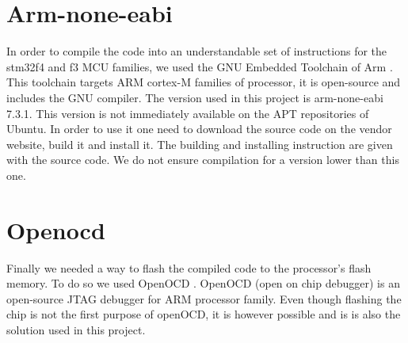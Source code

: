 \documentclass[12pt,a4paper]{report}
\begin{document}
\section{Arm-none-eabi}
In order to compile the code into an understandable set of instructions for the stm32f4 and f3 MCU families, we used the GNU Embedded Toolchain of Arm \cite{arm}. This toolchain targets ARM cortex-M families of processor, it is open-source and includes the GNU compiler. The version used in this project is arm-none-eabi 7.3.1. This version is not immediately available on the APT repositories of Ubuntu. In order to use it one need to download the source code on the vendor website, build it and install it. The building and installing instruction are given with the source code. We do not ensure compilation for a version lower than this one.

\section{Openocd}
Finally we needed a way to flash the compiled code to the processor's flash memory. To do so we used OpenOCD \cite{hoglAbstractopen}. OpenOCD (open on chip debugger) is an open-source JTAG debugger for ARM processor family. Even though flashing the chip is not the first purpose of openOCD, it is however possible and is is also the solution used in this project.
\end{document}
